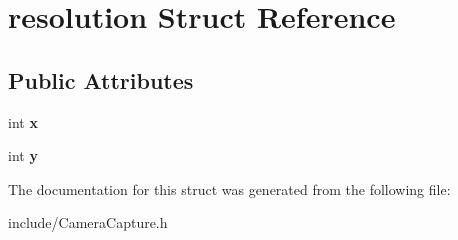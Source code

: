 \hypertarget{structresolution}{\section{resolution Struct Reference}
\label{structresolution}
}
\subsection*{Public Attributes}
\begin{DoxyCompactItemize}
\item 
\hypertarget{structresolution_ad0c45ccf2d99f482f3c31138822fdcaf}{int {\bfseries x}}\label{structresolution_ad0c45ccf2d99f482f3c31138822fdcaf}

\item 
\hypertarget{structresolution_ab1fc0e14f43778ee8e25710611cdee8a}{int {\bfseries y}}\label{structresolution_ab1fc0e14f43778ee8e25710611cdee8a}

\end{DoxyCompactItemize}


The documentation for this struct was generated from the following file\-:\begin{DoxyCompactItemize}
\item 
include/Camera\-Capture.\-h\end{DoxyCompactItemize}
